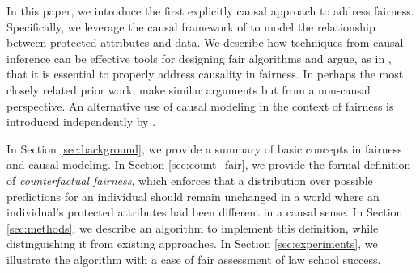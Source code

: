% 

In this paper, we introduce the first explicitly causal approach to
address fairness.  Specifically, we leverage the causal framework of
\citet{pearl2009causal} to model the relationship between protected
attributes and data. We describe how techniques from causal inference
can be effective tools for designing fair algorithms and argue, as in
\citet{dedeo2014wrong}, that it is essential to properly address
causality in fairness. In perhaps the most closely related prior work,
\citet{johnson2016impartial} make similar arguments but from a
non-causal perspective. An alternative use of causal modeling in
the context of fairness is introduced independently by \citep{kilbertus:17}.

In Section \ref{sec:background}, we provide a summary of basic
concepts in fairness and causal modeling. In Section
\ref{sec:count_fair}, we provide the formal definition of
\emph{counterfactual fairness}, which enforces that a distribution
over possible predictions for an individual should remain unchanged in
a world where an individual's protected attributes had been different
in a causal sense. In Section \ref{sec:methods}, we describe an
algorithm to implement this definition, while distinguishing it from
existing approaches.  In Section \ref{sec:experiments}, we illustrate
the algorithm with a case of fair assessment of law school success.

